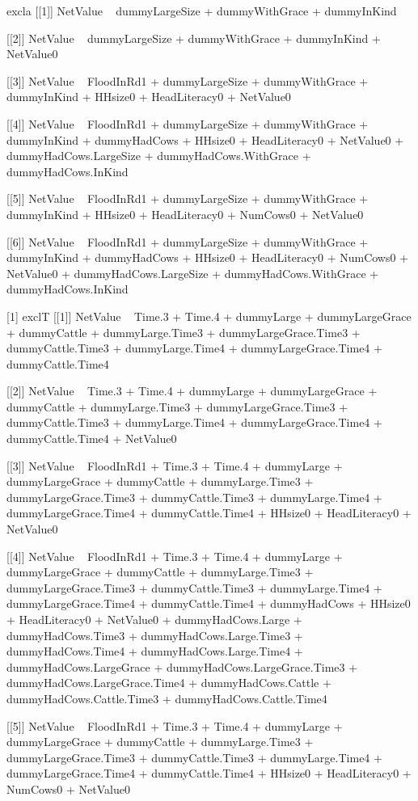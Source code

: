 \begin{Schunk}
\begin{Soutput}
[1] excla
[[1]]
NetValue ~ dummyLargeSize + dummyWithGrace + dummyInKind

[[2]]
NetValue ~ dummyLargeSize + dummyWithGrace + dummyInKind + NetValue0

[[3]]
NetValue ~ FloodInRd1 + dummyLargeSize + dummyWithGrace + dummyInKind + 
    HHsize0 + HeadLiteracy0 + NetValue0

[[4]]
NetValue ~ FloodInRd1 + dummyLargeSize + dummyWithGrace + dummyInKind + 
    dummyHadCows + HHsize0 + HeadLiteracy0 + NetValue0 + dummyHadCows.LargeSize + 
    dummyHadCows.WithGrace + dummyHadCows.InKind

[[5]]
NetValue ~ FloodInRd1 + dummyLargeSize + dummyWithGrace + dummyInKind + 
    HHsize0 + HeadLiteracy0 + NumCows0 + NetValue0

[[6]]
NetValue ~ FloodInRd1 + dummyLargeSize + dummyWithGrace + dummyInKind + 
    dummyHadCows + HHsize0 + HeadLiteracy0 + NumCows0 + NetValue0 + 
    dummyHadCows.LargeSize + dummyHadCows.WithGrace + dummyHadCows.InKind

[1] exclT
[[1]]
NetValue ~ Time.3 + Time.4 + dummyLarge + dummyLargeGrace + dummyCattle + 
    dummyLarge.Time3 + dummyLargeGrace.Time3 + dummyCattle.Time3 + 
    dummyLarge.Time4 + dummyLargeGrace.Time4 + dummyCattle.Time4

[[2]]
NetValue ~ Time.3 + Time.4 + dummyLarge + dummyLargeGrace + dummyCattle + 
    dummyLarge.Time3 + dummyLargeGrace.Time3 + dummyCattle.Time3 + 
    dummyLarge.Time4 + dummyLargeGrace.Time4 + dummyCattle.Time4 + 
    NetValue0

[[3]]
NetValue ~ FloodInRd1 + Time.3 + Time.4 + dummyLarge + dummyLargeGrace + 
    dummyCattle + dummyLarge.Time3 + dummyLargeGrace.Time3 + 
    dummyCattle.Time3 + dummyLarge.Time4 + dummyLargeGrace.Time4 + 
    dummyCattle.Time4 + HHsize0 + HeadLiteracy0 + NetValue0

[[4]]
NetValue ~ FloodInRd1 + Time.3 + Time.4 + dummyLarge + dummyLargeGrace + 
    dummyCattle + dummyLarge.Time3 + dummyLargeGrace.Time3 + 
    dummyCattle.Time3 + dummyLarge.Time4 + dummyLargeGrace.Time4 + 
    dummyCattle.Time4 + dummyHadCows + HHsize0 + HeadLiteracy0 + 
    NetValue0 + dummyHadCows.Large + dummyHadCows.Time3 + dummyHadCows.Large.Time3 + 
    dummyHadCows.Time4 + dummyHadCows.Large.Time4 + dummyHadCows.LargeGrace + 
    dummyHadCows.LargeGrace.Time3 + dummyHadCows.LargeGrace.Time4 + 
    dummyHadCows.Cattle + dummyHadCows.Cattle.Time3 + dummyHadCows.Cattle.Time4

[[5]]
NetValue ~ FloodInRd1 + Time.3 + Time.4 + dummyLarge + dummyLargeGrace + 
    dummyCattle + dummyLarge.Time3 + dummyLargeGrace.Time3 + 
    dummyCattle.Time3 + dummyLarge.Time4 + dummyLargeGrace.Time4 + 
    dummyCattle.Time4 + HHsize0 + HeadLiteracy0 + NumCows0 + 
    NetValue0


\end{Soutput}
\end{Schunk}
